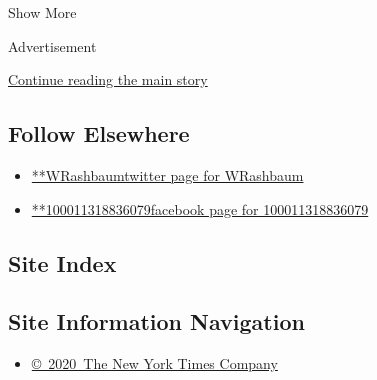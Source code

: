 Show More

Advertisement

\protect\hyperlink{after-mid2}{Continue reading the main story}

\hypertarget{follow-elsewhere}{%
\subsection{Follow Elsewhere}\label{follow-elsewhere}}

\begin{itemize}
\tightlist
\item
  \href{https://twitter.com/WRashbaum}{**WRashbaumtwitter page for
  WRashbaum}
\item
  \href{https://www.facebookcorewwwi.onion/100011318836079}{**100011318836079facebook
  page for 100011318836079}
\end{itemize}

\hypertarget{site-index}{%
\subsection{Site Index}\label{site-index}}

\hypertarget{site-information-navigation}{%
\subsection{Site Information
Navigation}\label{site-information-navigation}}

\begin{itemize}
\tightlist
\item
  \href{https://help.nytimes3xbfgragh.onion/hc/en-us/articles/115014792127-Copyright-notice}{©~2020~The
  New York Times Company}
\end{itemize}

